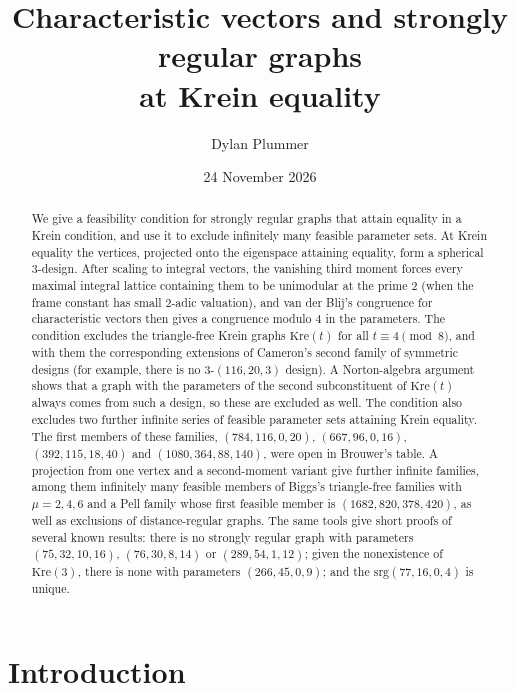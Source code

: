 \documentclass[11pt]{article}
\title{Characteristic vectors and strongly regular graphs\\ at Krein equality}
\author{Dylan Plummer}
\date{24 November 2026}
\theoremstyle{definition}
\theoremstyle{remark}
\newcommand{\Kre}{\mathrm{Kre}}
\begin{document}
\maketitle

\begin{abstract}
We give a feasibility condition for strongly regular graphs that attain
equality in a Krein condition, and use it to exclude infinitely many feasible
parameter sets. At Krein equality the vertices, projected onto the
eigenspace attaining equality, form a spherical $3$-design. After scaling to
integral vectors, the vanishing third moment forces every maximal integral
lattice containing them to be unimodular at the prime $2$ (when the frame
constant has small $2$-adic valuation), and van der Blij's congruence for
characteristic vectors then gives a congruence modulo $4$ in the parameters.
The condition excludes the triangle-free Krein graphs $\Kre(t)$ for all
$t\equiv4\pmod 8$, and with them the corresponding extensions of Cameron's
second family of symmetric designs (for example, there is no
$3$-$(116,20,3)$ design). A Norton-algebra argument shows that a graph with
the parameters of the second subconstituent of $\Kre(t)$ always comes from
such a design, so these are excluded as well. The condition also excludes two
further infinite series of feasible parameter sets attaining Krein equality.
The first members of these families, $(784,116,0,20)$, $(667,96,0,16)$,
$(392,115,18,40)$ and $(1080,364,88,140)$, were open in Brouwer's table. A
projection from one vertex and a second-moment variant give further
infinite families, among them infinitely many feasible members of Biggs's
triangle-free families with $\mu=2,4,6$ and a Pell family whose first feasible
member is $(1682,820,378,420)$, as well as exclusions of distance-regular
graphs. The same tools give short proofs of several known results: there is no
strongly regular graph with parameters $(75,32,10,16)$, $(76,30,8,14)$ or
$(289,54,1,12)$; given the nonexistence of $\Kre(3)$, there is none with
parameters $(266,45,0,9)$; and the $\mathrm{srg}(77,16,0,4)$ is unique.
\end{abstract}

\section{Introduction}\label{sec:intro}
\end{document}

